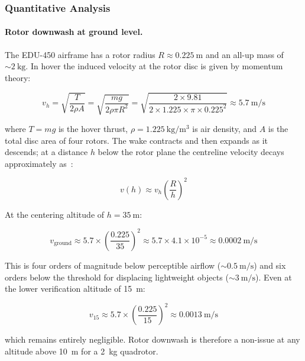 \subsubsection{Quantitative Analysis}

\paragraph{Rotor downwash at ground level.}
The EDU-450 airframe has a rotor radius $R \approx \SI{0.225}{\metre}$ and an all-up mass of ${\sim}\SI{2}{\kilogram}$. In hover the induced velocity at the rotor disc is given by momentum theory:

\begin{equation}\label{eq:v-hover}
    v_h = \sqrt{\frac{T}{2\rho A}} = \sqrt{\frac{mg}{2\rho\pi R^2}} = \sqrt{\frac{2 \times 9.81}{2 \times 1.225 \times \pi \times 0.225^2}} \approx \SI{5.7}{\metre\per\second}
\end{equation}

\noindent where $T = mg$ is the hover thrust, $\rho = \SI{1.225}{\kilogram\per\metre\cubed}$ is air density, and $A$ is the total disc area of four rotors. The wake contracts and then expands as it descends; at a distance $h$ below the rotor plane the centreline velocity decays approximately as~\cite{johnson2013helicopter}:

\begin{equation}\label{eq:v-ground}
    v(h) \approx v_h \left(\frac{R}{h}\right)^2
\end{equation}

\noindent At the centering altitude of $h = \SI{35}{\metre}$:

\begin{equation}
    v_{\text{ground}} \approx 5.7 \times \left(\frac{0.225}{35}\right)^2 \approx 5.7 \times 4.1 \times 10^{-5} \approx \SI{0.0002}{\metre\per\second}
\end{equation}

\noindent This is four orders of magnitude below perceptible airflow (${\sim}\SI{0.5}{\metre\per\second}$) and six orders below the threshold for displacing lightweight objects (${\sim}\SI{3}{\metre\per\second}$). Even at the lower verification altitude of \SI{15}{\metre}:

\begin{equation}
    v_{15} \approx 5.7 \times \left(\frac{0.225}{15}\right)^2 \approx \SI{0.0013}{\metre\per\second}
\end{equation}

\noindent which remains entirely negligible. Rotor downwash is therefore a non-issue at any altitude above \SI{10}{\metre} for a \SI{2}{\kilogram} quadrotor.

